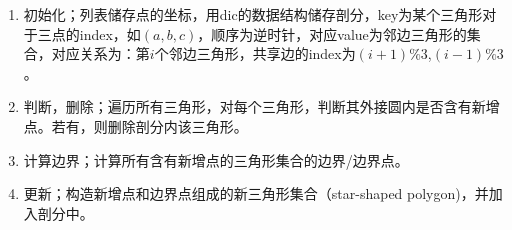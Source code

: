 \documentclass[a4paper]{article}
\begin{document}
  \begin{figure}[htpb]
  \centering 
\end{figure}

\begin{enumerate}
  \item 初始化；列表储存点的坐标，用dic的数据结构储存剖分，key为某个三角形对于三点的index，如$(a,b,c)$，顺序为逆时针，对应value为邻边三角形的集合，对应关系为：第$i$个邻边三角形，共享边的index为$(i+1)\%3$,$(i-1)\%3$。
  \item 判断，删除；遍历所有三角形，对每个三角形，判断其外接圆内是否含有新增点。若有，则删除剖分内该三角形。
  \item 计算边界；计算所有含有新增点的三角形集合的边界/边界点。
  \item 更新；构造新增点和边界点组成的新三角形集合（star-shaped polygon)，并加入剖分中。
  \end{enumerate}
 
\end{document}
